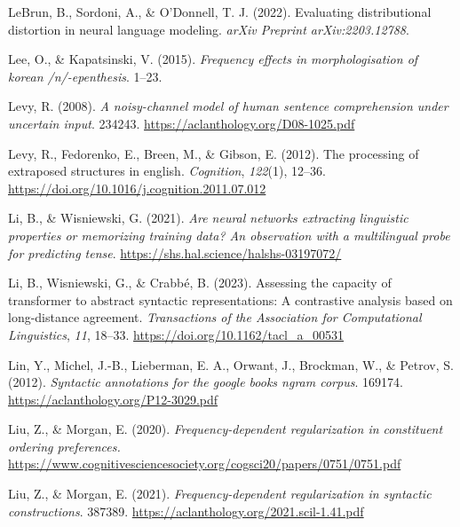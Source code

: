 \documentclass[
  12pt,
  letterpaper,
]{scrreprt}
\newlength{\cslhangindent}
\newenvironment{CSLReferences}[2] %
 {\begin{list}{}{%
  \setlength{\itemindent}{0pt}
  \setlength{\leftmargin}{0pt}
  \setlength{\parsep}{0pt}
  \ifodd #1
   \setlength{\leftmargin}{\cslhangindent}
   \setlength{\itemindent}{-1\cslhangindent}
  \fi
  \setlength{\itemsep}{#2\baselineskip}}}
 {\end{list}}
\begin{document}
\begin{CSLReferences}{1}{0}
LeBrun, B., Sordoni, A., \& O'Donnell, T. J. (2022). Evaluating
distributional distortion in neural language modeling. \emph{arXiv
Preprint arXiv:2203.12788}.

Lee, O., \& Kapatsinski, V. (2015). \emph{Frequency effects in
morphologisation of korean /n/-epenthesis}. 1--23.

Levy, R. (2008). \emph{A noisy-channel model of human sentence
comprehension under uncertain input}. 234243.
\url{https://aclanthology.org/D08-1025.pdf}

Levy, R., Fedorenko, E., Breen, M., \& Gibson, E. (2012). The processing
of extraposed structures in english. \emph{Cognition}, \emph{122}(1),
12--36. \url{https://doi.org/10.1016/j.cognition.2011.07.012}

Li, B., \& Wisniewski, G. (2021). \emph{Are neural networks extracting
linguistic properties or memorizing training data? An observation with a
multilingual probe for predicting tense}.
\url{https://shs.hal.science/halshs-03197072/}

Li, B., Wisniewski, G., \& Crabbé, B. (2023). Assessing the capacity of
transformer to abstract syntactic representations: A contrastive
analysis based on long-distance agreement. \emph{Transactions of the
Association for Computational Linguistics}, \emph{11}, 18--33.
\url{https://doi.org/10.1162/tacl_a_00531}

Lin, Y., Michel, J.-B., Lieberman, E. A., Orwant, J., Brockman, W., \&
Petrov, S. (2012). \emph{Syntactic annotations for the google books
ngram corpus}. 169174. \url{https://aclanthology.org/P12-3029.pdf}

Liu, Z., \& Morgan, E. (2020). \emph{Frequency-dependent regularization
in constituent ordering preferences.}
\url{https://www.cognitivesciencesociety.org/cogsci20/papers/0751/0751.pdf}

Liu, Z., \& Morgan, E. (2021). \emph{Frequency-dependent regularization
in syntactic constructions}. 387389.
\url{https://aclanthology.org/2021.scil-1.41.pdf}


\end{CSLReferences}
\end{document}
